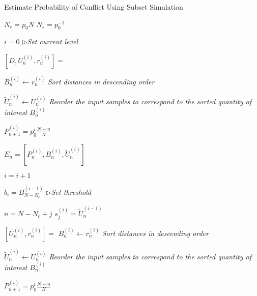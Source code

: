 \documentclass[journal]{IEEEtran}
\begin{document}
\begin{algorithm}[!t]
\caption{Estimate Probability of Conflict Using Subset Simulation}
\label{alg:SS_pc}
\begin{algorithmic}[1]
	
\State $N_{c} = p_{0}N$
	\State $N_{s} = p_{0}^{-1}$
	
\State $i = 0$ \textit{$\triangleright$Set current level}
	
\State $[D, U_{n}^{(i)}, r_{n}^{(i)}] = $ 
	
\State $B_{n}^{(i)} \leftarrow r_{n}^{(i)}$ \textit{Sort distances in descending order}
	
\State $\tilde{U}_{n}^{(i)} \leftarrow U_{n}^{(i)}$ \textit{Reorder the input samples to correspond to the sorted quantity of interest $B_{n}^{(i)}$}
	
			\State $P_{n+1}^{(i)} = p_{0}^i\frac{N - n}{N}$
		\EndFor

	\State $E_{n} = [P_{n}^{(i)},B_{n}^{(i)},\tilde{U}_{n}^{(i)}]$

	
		\State $i = i+1$
		
\State $b_{i} = B_{N-N_{c}}^{(i-1)}$ \textit{$\triangleright$Set threshold}
		
			\State $n = N-N_{c}+j$
			\State $s_{j}^{(i)} = \tilde{U}_{n}^{(i-1)}$
		\EndFor
		
		\State $[U_{n}^{(i)}, r_{n}^{(i)}] = $ 
\State $B_{n}^{(i)} \leftarrow r_{n}^{(i)}$ \textit{Sort distances in descending order}
	
\State $\tilde{U}_{n}^{(i)} \leftarrow U_{n}^{(i)}$ \textit{Reorder the input samples to correspond to the sorted quantity of interest $B_{n}^{(i)}$}
	
			\State $P_{n+1}^{(i)} = p_{0}^i\frac{N - n}{N}$
		\EndFor
	

\end{algorithmic}
\end{algorithm}
\end{document}
